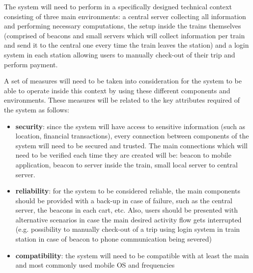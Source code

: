 The system will need to perform in a specifically designed technical context consisting of three main environments: a central server collecting all information and performing necessary computations, the setup inside the trains themselves (comprised of beacons and small servers which will collect information per train and send it to the central one every time the train leaves the station) and a login system in each station allowing users to manually check-out of their trip and perform payment.

A set of measures will need to be taken into consideration for the system to be able to operate inside this context by using these different components and environments. These measures will be related to the key attributes required of the system as follows:
\begin{itemize}

\item \textbf{security}: since the system will have access to sensitive information (such as location, financial transactions), every connection between components of the system will need to be secured and trusted. The main connections which will need to be verified each time they are created will be: beacon to mobile application, beacon to server inside the train, small local server to central server. 

\item \textbf{reliability}: for the system to be considered reliable, the main components should be provided with a back-up in case of failure, such as the central server, the beacons in each cart, etc. Also, users should be presented with alternative scenarios in case the main desired activity flow gets interrupted (e.g. possibility to manually check-out of a trip using login system in train station in case of beacon to phone communication being severed)

\item \textbf{compatibility}: the system will need to be compatible with at least the main and most commonly used mobile OS and frequencies 

\end{itemize}